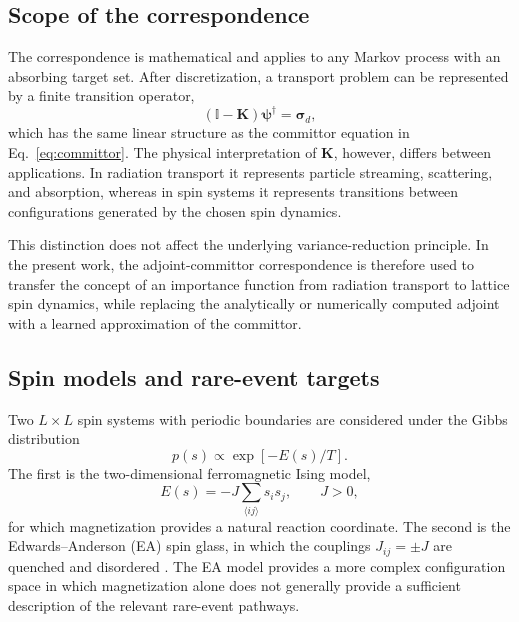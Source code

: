 \documentclass[a4paper,fleqn]{cas-sc}
\let\Oldsubsection\subsection
\renewcommand{\subsection}{\FloatBarrier\Oldsubsection}
\begin{document}
\subsection{Scope of the correspondence}\label{sec:scope}

The correspondence is mathematical and applies to any Markov process with an absorbing target set. After discretization, a transport problem can be represented by a finite transition operator,
\begin{equation}
(\mathbb I-\mathbf K)\boldsymbol{\psi}^{\dagger}
=\boldsymbol{\sigma}_d ,
\end{equation}
which has the same linear structure as the committor equation in Eq.~\eqref{eq:committor}. The physical interpretation of $\mathbf K$, however, differs between applications. In radiation transport it represents particle streaming, scattering, and absorption, whereas in spin systems it represents transitions between configurations generated by the chosen spin dynamics.

This distinction does not affect the underlying variance-reduction principle. In the present work, the adjoint-committor correspondence is therefore used to transfer the concept of an importance function from radiation transport to lattice spin dynamics, while replacing the analytically or numerically computed adjoint with a learned approximation of the committor.

\subsection{Spin models and rare-event targets}\label{sec:models}

Two $L\times L$ spin systems with periodic boundaries are considered under the Gibbs distribution
\begin{equation}
p(s)\propto \exp[-E(s)/T].
\end{equation}
The first is the two-dimensional ferromagnetic Ising model,
\begin{equation}
E(s)=-J\sum_{\langle ij\rangle}s_i s_j,\qquad J>0,
\end{equation}
for which magnetization provides a natural reaction coordinate. The second is the Edwards--Anderson (EA) spin glass, in which the couplings $J_{ij}=\pm J$ are quenched and disordered \cite{edwards1975,binder1986}. The EA model provides a more complex configuration space in which magnetization alone does not generally provide a sufficient description of the relevant rare-event pathways.
\end{document}
